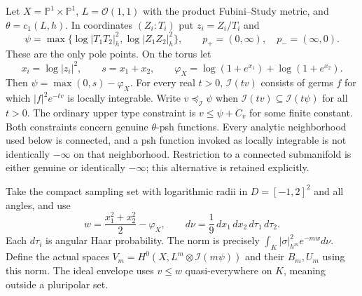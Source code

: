 \documentclass[11pt]{article}
\begin{document}
Let $X=\mathbb P^1\times\mathbb P^1$, $L=\mathcal O(1,1)$ with the
product Fubini--Study metric, and $\theta=c_1(L,h)$. In coordinates
$(Z_i:T_i)$ put $z_i=Z_i/T_i$ and
\[
 \psi=\max\{\log|T_1T_2|_h^2,\log|Z_1Z_2|_h^2\},\qquad
 p_+=(0,\infty),\quad p_-=(\infty,0).
\]
These are the only pole points. On the torus let
\[
 x_i=\log|z_i|^2,\qquad s=x_1+x_2,\qquad
 \varphi_X=\log(1+e^{x_1})+\log(1+e^{x_2}).
\]
Then $\psi=\max(0,s)-\varphi_X$. For every real $t>0$,
$\mathcal I(tv)$ consists of germs $f$ for which $|f|^2e^{-tv}$
is locally integrable. Write $v\preceq_{\mathcal I}\psi$ when
$\mathcal I(tv)\subseteq\mathcal I(t\psi)$ for all $t>0$.
The ordinary upper type constraint is $v\leq\psi+C_v$ for some
finite constant. Both constraints concern genuine $\theta$-psh functions.
Every analytic neighborhood used below is connected, and a psh function
invoked as locally integrable is not identically $-\infty$ on that
neighborhood. Restriction to a connected submanifold is either genuine
or identically $-\infty$; this alternative is retained explicitly.

Take the compact sampling set with logarithmic radii in
$D=[-1,2]^2$ and all angles, and use
\[
 w=\frac{x_1^2+x_2^2}{2}-\varphi_X,\qquad
 d\nu=\frac19\,dx_1\,dx_2\,d\tau_1\,d\tau_2.
\]
Each $d\tau_i$ is angular Haar probability. The norm is precisely
$\int_K|\sigma|_{h^m}^2e^{-mw}d\nu$. Define the actual spaces
$V_m=H^0(X,L^m\otimes\mathcal I(m\psi))$ and their $B_m,U_m$
using this norm. The ideal envelope uses $v\leq w$ quasi-everywhere
on $K$, meaning outside a pluripolar set.
\end{document}
